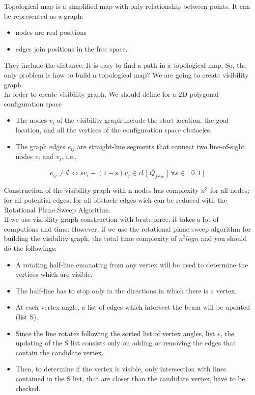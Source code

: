 \documentclass{article}
\begin{document}
Topological map is a simplified map with only relationship between points. It can be represented as a graph:

\begin{itemize}
  \item nodes are real positions
  \item edges join positions in the free space.
\end{itemize}

They include the distance. It is easy to find a path in a topological map. So, the only problem is how to build a topological map? We are going to create visibility graph.
\\

In order to create visibility graph. We should define for a 2D polygonal configuration space

\begin{itemize}
  \item The nodes $v_{i}$ of the visibility graph include the start location, the goal location, and all the vertices of the configuration space obstacles.
  \item The graph edges $e_{ij}$ are straight-line segments that connect two line-of-sight nodes $v_{i}$ and $v_{j}$, i.e., 
\end{itemize}

\begin{equation}
e_{ij} \neq \emptyset \Longleftrightarrow sv_{i} + (1 - s)v_{j} \in cl(Q_{free}) \forall s \in [0, 1]
\end{equation}

Construction of the visibility graph with n nodes has complexity $n^{3}$ for all nodes; for all potential edges; for all obstacle edges wich can be reduced with the Rotational Plane Sweep Algorithm.
\\

If we use visibility graph construction with brute force, it takes a lot of computions and time. However, if we use the rotational plane sweep algorithm for building the visibility graph, the total time complexity of $n^{2} logn$ and you should do the followings:

\begin{itemize}
  \item A rotating half-line emanating from any vertex will be used to determine the vertices which are visible.
  \item The half-line has to stop only in the directions in which there is a vertex.
  \item At each vertex angle, a list of edges which intersect the beam will be updated (list S).
  \item Since the line rotates following the sorted list of vertex angles, list $\varepsilon$, the updating of the S list consists only on adding or removing the edges that contain the candidate vertex.
  \item Then, to determine if the vertex is visible, only intersection with lines contained in the S list, that are closer than the candidate vertex, have to be checked.
\end{itemize}
\end{document}

